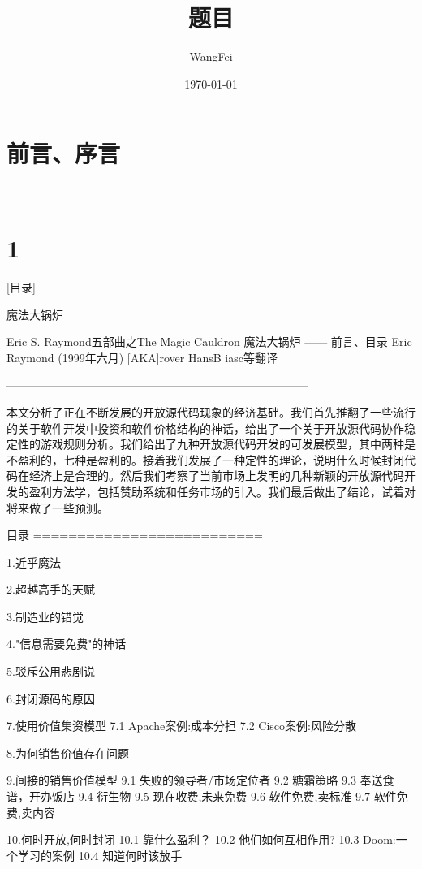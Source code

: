 \documentclass[a4paper,12pt,UTF8,twoside]{ctexbook}
\title{\heiti\zihao{0} 题目}
\author{WangFei}
\date{\today}
\begin{document}
\maketitle
\tableofcontents

\frontmatter
\chapter{前言、序言}

\mainmatter

~\\

 \qquad  

\chapter{1}


[目录]

魔法大锅炉

Eric S. Raymond五部曲之The Magic Cauldron
魔法大锅炉
—— 前言、目录
Eric Raymond (1999年六月)
[AKA]rover HansB iasc等翻译

--------------------------------------------------------------------------------

本文分析了正在不断发展的开放源代码现象的经济基础。我们首先推翻了一些流行的关于软件开发中投资和软件价格结构的神话，给出了一个关于开放源代码协作稳定性的游戏规则分析。我们给出了九种开放源代码开发的可发展模型，其中两种是不盈利的，七种是盈利的。接着我们发展了一种定性的理论，说明什么时候封闭代码在经济上是合理的。然后我们考察了当前市场上发明的几种新颖的开放源代码开发的盈利方法学，包括赞助系统和任务市场的引入。我们最后做出了结论，试着对将来做了一些预测。

目录
==========================

1.近乎魔法

2.超越高手的天赋

3.制造业的错觉

4."信息需要免费"的神话

5.驳斥公用悲剧说

6.封闭源码的原因

7.使用价值集资模型
7.1 Apache案例:成本分担
7.2 Cisco案例:风险分散

8.为何销售价值存在问题

9.间接的销售价值模型
9.1 失败的领导者/市场定位者
9.2 糖霜策略
9.3 奉送食谱，开办饭店
9.4 衍生物
9.5 现在收费,未来免费
9.6 软件免费,卖标准
9.7 软件免费,卖内容

10.何时开放,何时封闭
10.1 靠什么盈利？
10.2 他们如何互相作用?
10.3 Doom:一个学习的案例
10.4 知道何时该放手
\end{document}
